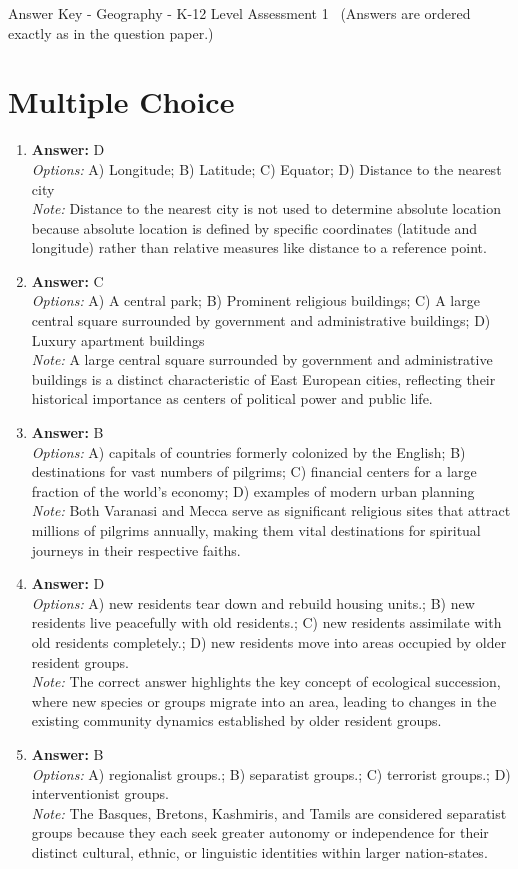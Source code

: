 \documentclass[12pt]{article}
\begin{document}
\begin{center}
Answer Key - Geography - K-12 Level Assessment 1 \
\small (Answers are ordered exactly as in the question paper.)
\end{center}

\section*{Multiple Choice}
\begin{enumerate}[label=\arabic*.]
\item \textbf{Answer:} D
\\ \textit{Options:} A) Longitude; B) Latitude; C) Equator; D) Distance to the nearest city
\\ \textit{Note:} Distance to the nearest city is not used to determine absolute location because absolute location is defined by specific coordinates (latitude and longitude) rather than relative measures like distance to a reference point.
\item \textbf{Answer:} C
\\ \textit{Options:} A) A central park; B) Prominent religious buildings; C) A large central square surrounded by government and administrative buildings; D) Luxury apartment buildings
\\ \textit{Note:} A large central square surrounded by government and administrative buildings is a distinct characteristic of East European cities, reflecting their historical importance as centers of political power and public life.
\item \textbf{Answer:} B
\\ \textit{Options:} A) capitals of countries formerly colonized by the English; B) destinations for vast numbers of pilgrims; C) financial centers for a large fraction of the world's economy; D) examples of modern urban planning
\\ \textit{Note:} Both Varanasi and Mecca serve as significant religious sites that attract millions of pilgrims annually, making them vital destinations for spiritual journeys in their respective faiths.
\item \textbf{Answer:} D
\\ \textit{Options:} A) new residents tear down and rebuild housing units.; B) new residents live peacefully with old residents.; C) new residents assimilate with old residents completely.; D) new residents move into areas occupied by older resident groups.
\\ \textit{Note:} The correct answer highlights the key concept of ecological succession, where new species or groups migrate into an area, leading to changes in the existing community dynamics established by older resident groups.
\item \textbf{Answer:} B
\\ \textit{Options:} A) regionalist groups.; B) separatist groups.; C) terrorist groups.; D) interventionist groups.
\\ \textit{Note:} The Basques, Bretons, Kashmiris, and Tamils are considered separatist groups because they each seek greater autonomy or independence for their distinct cultural, ethnic, or linguistic identities within larger nation-states.
\end{enumerate}
\end{document}
